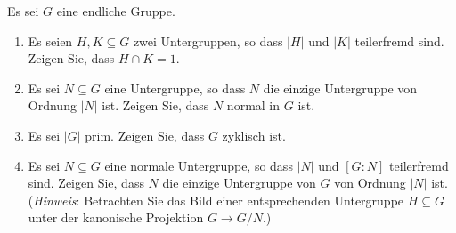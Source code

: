 \begin{question}[subtitle = Zur Ordnung]
  \label{question: basic calculatings with orders}
  Es sei $G$ eine endliche Gruppe.
  \begin{enumerate}
    \item
      Es seien $H, K \subseteq G$ zwei Untergruppen, so dass $|H|$ und $|K|$ teilerfremd sind.
      Zeigen Sie, dass $H \cap K = 1$.
    \item
      Es sei $N \subseteq G$ eine Untergruppe, so dass $N$ die einzige Untergruppe von Ordnung $|N|$ ist.
      Zeigen Sie, dass $N$ normal in $G$ ist.
    \item
      Es sei $|G|$ prim.
      Zeigen Sie, dass $G$ zyklisch ist.
    \item
      Es sei $N \subseteq G$ eine normale Untergruppe, so dass $|N|$ und $[G : N]$ teilerfremd sind.
      Zeigen Sie, dass $N$ die einzige Untergruppe von $G$ von Ordnung $|N|$ ist. \\
      (\emph{Hinweis}:
       Betrachten Sie das Bild einer entsprechenden Untergruppe $H \subseteq G$ unter der kanonische Projektion $G \to G/N$.)
  \end{enumerate}
\end{question}


